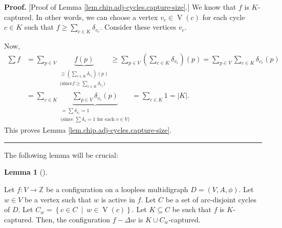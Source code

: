 \documentclass[numbers=enddot,12pt,final,onecolumn,notitlepage]{scrartcl}%
\theoremstyle{definition}
\newtheorem{lem}[theo]{Lemma}
\newenvironment{lemma}[1][]
{\begin{lem}[#1]\begin{leftbar}}
{\end{leftbar}\end{lem}}
\newenvironment{proof}[1][Proof]{\noindent\textbf{#1.} }{\ \rule{0.5em}{0.5em}}
\let\sumnonlimits\sum
\renewcommand{\sum}{\sumnonlimits\limits}
\begin{document}
\begin{proof}
[Proof of Lemma \ref{lem.chip.adj-cycles.capture-size}.] We know that $f$ is
$K$-captured. In other words, we can choose a vertex $v_{c}\in
\operatorname*{V}\left(  c\right)  $ for each cycle $c\in K$ such that
$f\geq\sum_{c\in K}\delta_{v_{c}}$. Consider these vertices $v_{c}$.

Now,%
\begin{align*}
\sum f  & =\sum_{p\in V}\underbrace{f\left(  p\right)  }_{\substack{\geq
\left(  \sum_{c\in K}\delta_{v_{c}}\right)  \left(  p\right)  \\\text{(since
}f\geq\sum_{c\in K}\delta_{v_{c}}\text{)}}}\geq\sum_{p\in V}\left(  \sum_{c\in
K}\delta_{v_{c}}\right)  \left(  p\right)  =\sum_{p\in V}\sum_{c\in K}%
\delta_{v_{c}}\left(  p\right)  \\
& =\sum_{c\in K}\underbrace{\sum_{p\in V}\delta_{v_{c}}\left(  p\right)
}_{\substack{=\sum\delta_{v_{c}}=1\\\text{(since }\sum\delta_{v}=1\text{ for
each }v\in V\text{)}}}=\sum_{c\in K}1=\left\vert K\right\vert .
\end{align*}
This proves Lemma \ref{lem.chip.adj-cycles.capture-size}.
\end{proof}

The following lemma will be crucial:

\begin{lemma}
\label{lem.chip.adj-cycles.capture}Let $f:V\rightarrow\mathbb{Z}$ be a
configuration on a loopless multidigraph $D=\left(  V,A,\phi\right)  $. Let
$w\in V$ be a vertex such that $w$ is active in $f$. Let $C$ be a set of
arc-disjoint cycles of $D$. Let $C_{w}=\left\{  c\in C\ \mid\ w\in
\operatorname*{V}\left(  c\right)  \right\}  $. Let $K\subseteq C$ be such
that $f$ is $K$-captured. Then, the configuration $f-\Delta w$ is $K\cup
C_{w}$-captured.
\end{lemma}
\end{document}
